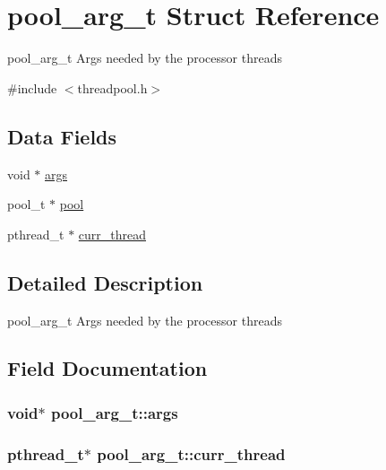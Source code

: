 \hypertarget{structpool__arg}{}\section{pool\+\_\+arg\+\_\+t Struct Reference}
\label{structpool__arg}


pool\+\_\+arg\+\_\+t Args needed by the processor threads  




{\ttfamily \#include $<$threadpool.\+h$>$}

\subsection*{Data Fields}
\begin{DoxyCompactItemize}
\item 
void $\ast$ \hyperlink{structpool__arg_aaacdcef6afd4123a30bcd16524542f1f}{args}
\item 
pool\+\_\+t $\ast$ \hyperlink{structpool__arg_aaee1659dd06b0712e063bc0d95cb7175}{pool}
\item 
pthread\+\_\+t $\ast$ \hyperlink{structpool__arg_a230d8331054ccd6631517549206bd5c5}{curr\+\_\+thread}
\end{DoxyCompactItemize}


\subsection{Detailed Description}
pool\+\_\+arg\+\_\+t Args needed by the processor threads 

\subsection{Field Documentation}
\hypertarget{structpool__arg_aaacdcef6afd4123a30bcd16524542f1f}{}
\subsubsection[{args}]{\setlength{\rightskip}{0pt plus 5cm}void$\ast$ pool\+\_\+arg\+\_\+t\+::args}\label{structpool__arg_aaacdcef6afd4123a30bcd16524542f1f}
\hypertarget{structpool__arg_a230d8331054ccd6631517549206bd5c5}{}
\subsubsection[{curr\+\_\+thread}]{\setlength{\rightskip}{0pt plus 5cm}pthread\+\_\+t$\ast$ pool\+\_\+arg\+\_\+t\+::curr\+\_\+thread}\label{structpool__arg_a230d8331054ccd6631517549206bd5c5}
\hypertarget{structpool__arg_aaee1659dd06b0712e063bc0d95cb7175}{}
